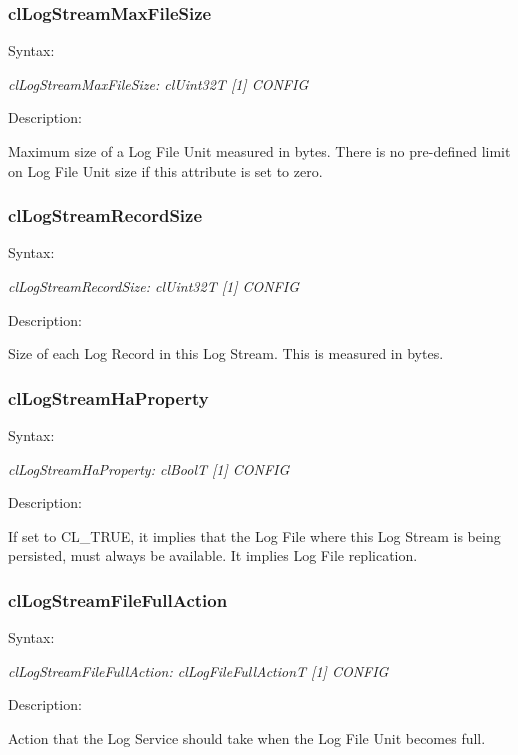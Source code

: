 \begin{flushleft}
\subsubsection{clLogStreamMaxFileSize}
\begin{Desc}
\item[Syntax:]
\end{Desc}
\textit{clLogStreamMaxFileSize: clUint32T [1] {CONFIG}}
\begin{Desc}
 \item[Description:]
\end{Desc}
Maximum size of a Log File Unit measured in bytes. There is no pre-defined limit on
Log File Unit size if this attribute is set to zero.



\subsubsection{clLogStreamRecordSize}
\begin{Desc}
\item[Syntax:]
\end{Desc}
\textit{clLogStreamRecordSize: clUint32T [1] {CONFIG}}
\begin{Desc}
 \item[Description:]
\end{Desc}
Size of each Log Record in this Log Stream. This is measured in bytes.


\subsubsection{clLogStreamHaProperty}
\begin{Desc}
\item[Syntax:]
\end{Desc}
\textit{clLogStreamHaProperty: clBoolT [1] {CONFIG}}
\begin{Desc}
 \item[Description:]
\end{Desc}
If set to CL\_\-TRUE, it implies that the Log File where this Log Stream is being persisted, must always be available. It implies Log File replication.



\subsubsection{clLogStreamFileFullAction}
\begin{Desc}
\item[Syntax:]
\end{Desc}
\textit{clLogStreamFileFullAction: clLogFileFullActionT [1] {CONFIG}}
\begin{Desc}
 \item[Description:]
\end{Desc}
Action that the Log Service should take when the Log File Unit becomes full.




\end{flushleft}
